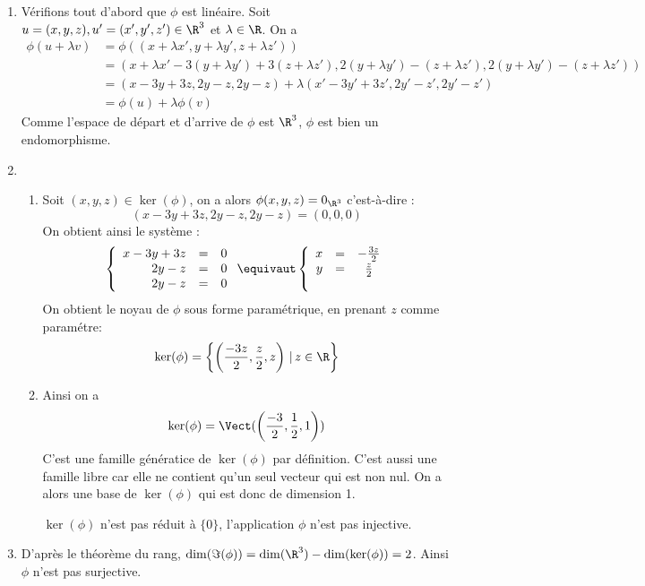 \begin{correction}
\begin{enumerate}


\item Vérifions tout d'abord que $\phi$ est linéaire. Soit $u=(x,y,z), u'=(x',y',z')\in\R^3$ et $\lambda\in \R$. 
On a 
\begin{align*}
\phi( u+\lambda v  ) &= \phi(  (x+\lambda x', y+\lambda y' , z+\lambda z'))\\
								&= (x+\lambda x'-3(y+\lambda y' ) +3(z+\lambda z'), 2(y+\lambda y' )-(z+\lambda z'), 2(y+\lambda y' )-(z+\lambda z'))\\
								&= (x-3y +3z, 2y-z, 2y-z) + \lambda  (x'-3y' +3z', 2y'-z', 2y'-z')\\
								&= \phi(u) +\lambda \phi(v)
\end{align*}
Comme l'espace de départ et d'arrive de $\phi $ est $\R^3$, $\phi$ est bien un endomorphisme. 

\item \begin{enumerate}
\item Soit $(x,y,z)\in \ker( \phi)$, on a 
alors $\phi(x,y,z)= 0_{\R^3}$ c'est-à-dire : 
$$(x-3y +3z, 2y-z, 2y-z)=(0,0,0)$$
On obtient ainsi le système :
$$\left\{ 
\begin{array}{rcc}
x-3y +3z &=&0\\
2y-z &=&0\\
2y-z&=&0
\end{array}
\right.
\equivaut 
\left\{ 
\begin{array}{rcc}
x &=&-\frac{3z}{2}\\
y &=&\frac{z}{2}\\
\phantom{}& &
\end{array}
\right.
$$ 
On obtient le noyau de $\phi$ sous forme paramétrique, en prenant $z$ comme paramétre:
$$\ker(\phi) =\left\{ 
\left(\frac{-3z}{2} , \frac{z}{2}, z\right)\,  |\, z\in \R
\right\}$$
\item Ainsi on a 
$$\ker(\phi)  =\Vect(\left( \frac{-3}{2}, \frac{1}{2}, 1\right))$$
C'est une famille génératice de $\ker(\phi)$ par définition. C'est aussi une famille libre car elle ne contient qu'un seul vecteur qui est non nul. 
On a alors une base de $\ker (\phi)$ qui est donc de dimension 1. 

$\ker(\phi)$ n'est pas  réduit à $\{ 0\}$, l'application $\phi$ n'est pas injective.

\end{enumerate}
\item D'après le théorème du rang, $\dim(\Im(\phi))= \dim (\R^3 )- \dim(\ker(\phi)) = 2$. Ainsi $\phi$ n'est pas surjective. 


\end{enumerate}
\end{correction}
